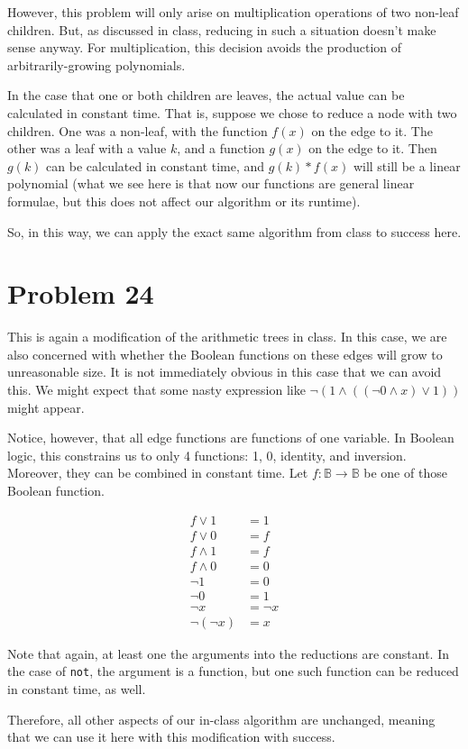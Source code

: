 \documentclass{article}
\providecommand{\prob}[1]{\section*{Problem #1}}
\begin{document}
However, this problem will only arise on multiplication operations of two non-leaf children.
But, as discussed in class, reducing in such a situation doesn't make sense anyway.
For multiplication, this decision avoids the production of arbitrarily-growing polynomials.

In the case that one or both children are leaves, the actual value can be calculated in constant time.
That is, suppose we chose to reduce a node with two children.
One was a non-leaf, with the function $f(x)$ on the edge to it.
The other was a leaf with a value $k$, and a function $g(x)$ on the edge to it.
Then $g(k)$ can be calculated in constant time, and $g(k)*f(x)$ will still be a linear polynomial
(what we see here is that now our functions are general linear formulae, but this does not affect our algorithm or its runtime).

So, in this way, we can apply the exact same algorithm from class to success here.

\prob{24}
This is again a modification of the arithmetic trees in class.
In this case, we are also concerned with whether the Boolean functions on these edges will grow to unreasonable size.
It is not immediately obvious in this case that we can avoid this.
We might expect that some nasty expression like $\lnot(1 \land ((\lnot 0 \land x ) \lor 1))$ might appear.

Notice, however, that all edge functions are functions of one variable.
In Boolean logic, this constrains us to only 4 functions: 1, 0, identity, and inversion.
Moreover, they can be combined in constant time.
Let $f: \mathbb{B} \to \mathbb{B}$ be one of those Boolean function.

\begin{align*}
    f \lor 1 &= 1\\
    f \lor 0 &= f\\
    f \land 1 &= f\\
    f \land 0 &= 0\\
    \lnot 1 &= 0\\
    \lnot 0 &= 1\\
    \lnot x &= \lnot x\\
    \lnot (\lnot x) &= x
\end{align*}

Note that again, at least one the arguments into the reductions are constant.
In the case of \verb|not|, the argument is a function, but one such function can be reduced in constant time, as well.

Therefore, all other aspects of our in-class algorithm are unchanged, meaning that we can use it here with this modification with success.
\end{document}
